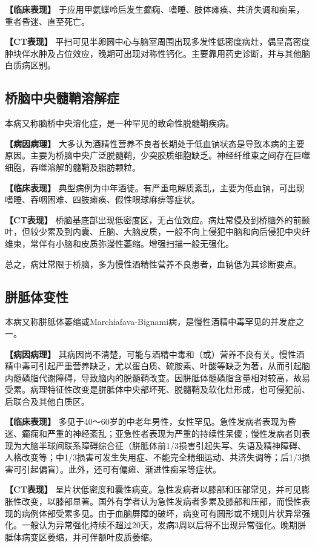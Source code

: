 \textbf{【临床表现】}
于应用甲氨蝶呤后发生癫痫、嗜睡、肢体瘫痪、共济失调和痴呆，重者昏迷、直至死亡。

\textbf{【CT表现】}
平扫可见半卵圆中心与脑室周围出现多发性低密度病灶，偶呈高密度肿块伴水肿及占位效应，晚期可出现对称性钙化。主要靠用药史诊断，并与其他脑白质病区别。

\subsection{桥脑中央髓鞘溶解症}

本病又称脑桥中央溶化症，是一种罕见的致命性脱髓鞘疾病。

\textbf{【病因病理】}
大多认为酒精性营养不良者长期处于低血钠状态是导致本病的主要原因。主要为桥脑中央广泛脱髓鞘，少突胶质细胞缺乏。神经纤维束之间存在巨噬细胞，吞噬溶解的髓鞘及脂肪颗粒。

\textbf{【临床表现】}
典型病例为中年酒徒。有严重电解质紊乱，主要为低血钠，可出现嗜睡、吞咽困难、四肢瘫痪、假性眼球麻痹等症状。

\textbf{【CT表现】}
桥脑基底部出现低密度区，无占位效应。病灶常侵及到桥脑外的前颞叶，但较少累及到内囊、丘脑、大脑皮质，一般不向上侵犯中脑和向后侵犯中央纤维束，常伴有小脑和皮质弥漫性萎缩。增强扫描一般无强化。

总之，病灶常限于桥脑，多为慢性酒精性营养不良患者，血钠低为其诊断要点。

\subsection{胼胝体变性}

本病又称胼胝体萎缩或Marchiafava-Bignami病，是慢性酒精中毒罕见的并发症之一。

\textbf{【病因病理】}
其病因尚不清楚，可能与酒精中毒和（或）营养不良有关。慢性酒精中毒可引起严重营养缺乏，尤以蛋白质、硫胺素、叶酸等缺乏为著，从而引起脑内髓磷脂代谢障碍，导致脑内的脱髓鞘改变。因胼胝体髓磷脂含量相对较高，故易受累。病理特征性改变是胼胝体中央部坏死、脱髓鞘及软化灶形成，也可侵犯前、后联合及其他白质区。

\textbf{【临床表现】}
多见于40～60岁的中老年男性，女性罕见。急性发病者表现为昏迷、癫痫和严重的神经紊乱；亚急性者表现为严重的持续性呆傻；慢性发病者则表现为大脑半球间联系障碍综合征（胼胝体前1/3损害引起失写、失语及精神障碍、人格改变等；中1/3损害可发生失用症、不能完全精细运动、共济失调等；后1/3损害可引起偏盲）。此外，还可有偏瘫、渐进性痴呆等症状。

\textbf{【CT表现】}
呈片状低密度和囊性病变。急性发病者以膝部和压部常见，并可见膨胀性改变，以膝部显著。国外有学者认为急性发病者多累及膝部和压部，而慢性表现的病例体部受累多见。由于血脑屏障的破坏，病变可有圆形或不规则片状异常强化。一般认为异常强化持续不超过20天，发病3周以后将不出现异常强化。晚期胼胝体病变区萎缩，并可伴额叶皮质萎缩。

